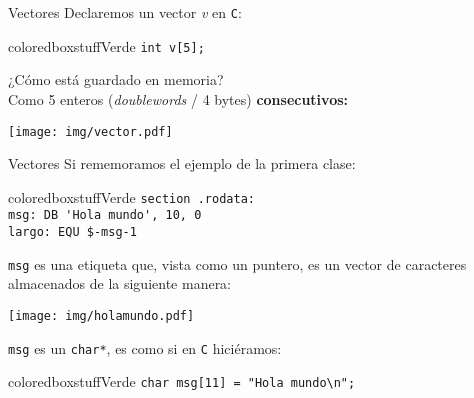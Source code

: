 \documentclass[aspectratio=169]{beamer}
\begin{document}
\begin{frame}[fragile]{Vectores}
    Declaremos un vector \textit{v} en \texttt{C}:\\
    \bigskip
    \pause
    \begin{beamercolorbox}[wd=0.9\textwidth,sep=0.5em]{coloredboxstuffVerde}
    \verb|int v[5];|
    \end{beamercolorbox}
    \bigskip
    ¿Cómo está guardado en memoria?\\
    \bigskip
    \pause
    Como 5 enteros (\textit{doublewords} / 4 bytes) \textbf{consecutivos:}\\
    \bigskip
    \begin{center}
    \texttt{[image: img/vector.pdf]}
    \end{center}
\end{frame}

\begin{frame}[fragile]{Vectores}
    Si rememoramos el ejemplo de la primera clase:\\
    \bigskip
    \begin{beamercolorbox}[wd=0.9\textwidth,sep=0.5em]{coloredboxstuffVerde}
    \verb|section .rodata:|\\
    \verb|msg: DB 'Hola mundo', 10, 0|\\
    \verb|largo: EQU $-msg-1|
    \end{beamercolorbox}
    \bigskip
    \pause
    \texttt{msg} es una etiqueta que, vista como un puntero, es un vector de caracteres almacenados de la siguiente manera:
    \begin{center}
    \texttt{[image: img/holamundo.pdf]}
    \end{center}
    \pause
    \small \texttt{msg} es un \texttt{char*}, es como si en \texttt{C} hiciéramos:\\
    \small
    \begin{beamercolorbox}[wd=0.9\textwidth,sep=0.5em]{coloredboxstuffVerde}
    \verb|char msg[11] = "Hola mundo\n";|
    \end{beamercolorbox}
\end{frame}
\end{document}
